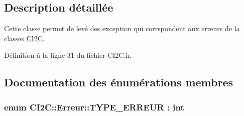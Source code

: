 \subsection{Description détaillée}
Cette classe permet de levé des exception qui corrspondent aux erreurs de la classes \hyperlink{class_c_i2_c}{C\+I2\+C}. 

Définition à la ligne 31 du fichier C\+I2\+C.\+h.



\subsection{Documentation des énumérations membres}
\hypertarget{class_c_i2_c_1_1_erreur_a153281c8e751b72b355d52c548b511d5}{
\subsubsection[{T\+Y\+P\+E\+\_\+\+E\+R\+R\+E\+U\+R}]{\setlength{\rightskip}{0pt plus 5cm}enum {\bf C\+I2\+C\+::\+Erreur\+::\+T\+Y\+P\+E\+\_\+\+E\+R\+R\+E\+U\+R} \+: int\hspace{0.3cm}{\ttfamily [strong]}}}\label{class_c_i2_c_1_1_erreur_a153281c8e751b72b355d52c548b511d5}
